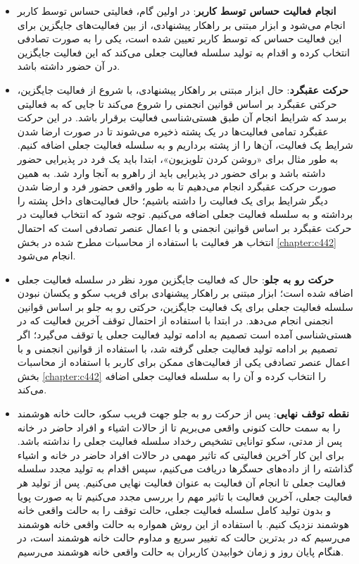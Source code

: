 \begin{itemize}
\item \textbf{انجام فعالیت حساس توسط کاربر}: در اولین گام، فعالیتی حساس توسط کاربر انجام می‌شود و ابزار مبتنی بر راهکار پیشنهادی، از بین فعالیت‌های جایگزین برای این فعالیت حساس که توسط کاربر تعیین شده است، یکی را به صورت تصادفی انتخاب کرده و اقدام به تولید سلسله فعالیت جعلی می‌کند که این فعالیت جایگزین در آن حضور داشته باشد.

\item \textbf{حرکت عقبگرد}: حال ابزار مبتنی بر راهکار پیشنهادی، با شروع از فعالیت جایگزین، حرکتی عقبگرد بر اساس قوانین انجمنی را شروع می‌کند تا جایی که به فعالیتی برسد که شرایط انجام آن طبق هستی‌شناسی فعالیت برقرار باشد. در این حرکت عقبگرد تمامی فعالیت‌ها در یک پشته ذخیره می‌شوند تا در صورت ارضا شدن شرایط یک فعالیت، آن‌ها را از پشته برداریم و به سلسله فعالیت جعلی اضافه کنیم. به طور مثال برای «روشن کردن تلویزیون»، ابتدا باید یک فرد در پذیرایی حضور داشته باشد و برای حضور در پذیرایی باید از راهرو به آنجا وارد شد. به همین صورت حرکت عقبگرد انجام می‌دهیم تا به طور واقعی حضور فرد و ارضا شدن دیگر شرایط برای یک فعالیت را داشته باشیم؛ حال فعالیت‌های داخل پشته را برداشته و به سلسله فعالیت جعلی اضافه می‌کنیم. توجه شود که انتخاب فعالیت در حرکت عقبگرد بر اساس قوانین انجمنی و با اعمال عنصر تصادفی است که احتمال انتخاب هر فعالیت با استفاده از محاسبات مطرح شده در بخش \ref{chapter:c442} انجام می‌شود.

\item \textbf{حرکت رو به جلو}: حال که فعالیت جایگزین مورد نظر در سلسله فعالیت جعلی اضافه شده است؛ ابزار مبتنی بر راهکار پیشنهادی برای فریب سکو و یکسان نبودن سلسله فعالیت جعلی برای یک فعالیت جایگزین، حرکتی رو به جلو بر اساس قوانین انجمنی انجام می‌دهد. در ابتدا با استفاده از احتمال توقف آخرین فعالیت که در هستی‌شناسی آمده است تصمیم به ادامه تولید فعالیت جعلی یا توقف می‌گیرد؛ اگر تصمیم بر ادامه تولید فعالیت جعلی گرفته شد، با استفاده از قوانین انجمنی و با اعمال عنصر تصادفی یکی از فعالیت‌های ممکن برای کاربر با استفاده از محاسبات بخش \ref{chapter:c442} را انتخاب کرده و آن را به سلسله فعالیت جعلی اضافه می‌کند.

\item \textbf{نقطه توقف نهایی}: پس از حرکت رو به جلو جهت فریب سکو، حالت خانه هوشمند را به سمت حالت کنونی واقعی می‌بریم تا از حالات اشیاء و افراد حاضر در خانه پس از مدتی، سکو توانایی تشخیص رخداد سلسله فعالیت جعلی را نداشته باشد. برای این کار آخرین فعالیتی که تاثیر مهمی در حالات افراد حاضر در خانه و اشیاء گذاشته را از داده‌های حسگرها دریافت می‌کنیم، سپس اقدام به تولید مجدد سلسله فعالیت جعلی تا انجام آن فعالیت به عنوان فعالیت نهایی می‌کنیم. پس از تولید هر فعالیت جعلی، آخرین فعالیت با تاثیر مهم را بررسی مجدد می‌کنیم تا به صورت پویا و بدون تولید کامل سلسله فعالیت جعلی، حالت توقف را به حالت واقعی خانه هوشمند نزدیک کنیم. با استفاده از این روش همواره به حالت واقعی خانه هوشمند می‌رسیم که در بدترین حالت که تغییر سریع و مداوم حالت خانه هوشمند است، در هنگام پایان روز و زمان خوابیدن کاربران به حالت واقعی خانه هوشمند می‌رسیم.
‌\end{itemize}

